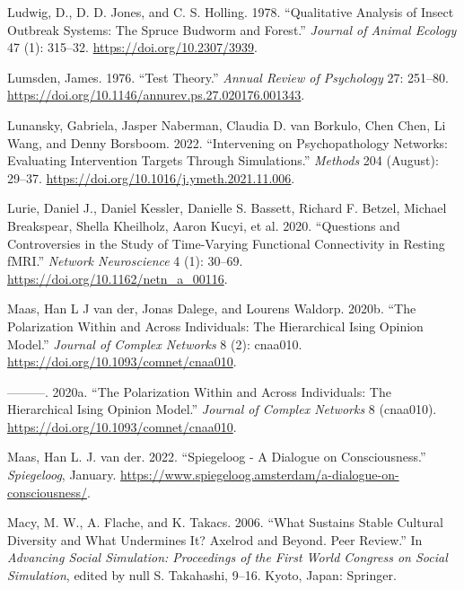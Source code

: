 \documentclass[
  a4paper,
  DIV=11,
  numbers=noendperiod]{scrreprt}
\newlength{\cslhangindent}
\newlength{\cslentryspacingunit} %
\newenvironment{CSLReferences}[2] %
 {%
  \setlength{\parindent}{0pt}
  \ifodd #1
  \let\oldpar\par
  \def\par{\hangindent=\cslhangindent\oldpar}
  \fi
  \setlength{\parskip}{#2\cslentryspacingunit}
 }%
 {}
\begin{document}
\begin{CSLReferences}{1}{0}
\leavevmode{}%
Ludwig, D., D. D. Jones, and C. S. Holling. 1978. {``Qualitative
Analysis of Insect Outbreak Systems: The Spruce Budworm and Forest.''}
\emph{Journal of Animal Ecology} 47 (1): 315--32.
\url{https://doi.org/10.2307/3939}.

\leavevmode{}%
Lumsden, James. 1976. {``Test Theory.''} \emph{Annual Review of
Psychology} 27: 251--80.
\url{https://doi.org/10.1146/annurev.ps.27.020176.001343}.

\leavevmode{}%
Lunansky, Gabriela, Jasper Naberman, Claudia D. van Borkulo, Chen Chen,
Li Wang, and Denny Borsboom. 2022. {``Intervening on Psychopathology
Networks: {Evaluating} Intervention Targets Through Simulations.''}
\emph{Methods} 204 (August): 29--37.
\url{https://doi.org/10.1016/j.ymeth.2021.11.006}.

\leavevmode{}%
Lurie, Daniel J., Daniel Kessler, Danielle S. Bassett, Richard F.
Betzel, Michael Breakspear, Shella Kheilholz, Aaron Kucyi, et al. 2020.
{``Questions and Controversies in the Study of Time-Varying Functional
Connectivity in Resting {fMRI}.''} \emph{Network Neuroscience} 4 (1):
30--69. \url{https://doi.org/10.1162/netn_a_00116}.

\leavevmode{}%
Maas, Han L J van der, Jonas Dalege, and Lourens Waldorp. 2020b. {``The
Polarization Within and Across Individuals: The Hierarchical Ising
Opinion Model.''} \emph{Journal of Complex Networks} 8 (2): cnaa010.
\url{https://doi.org/10.1093/comnet/cnaa010}.

\leavevmode{}%
---------. 2020a. {``The Polarization Within and Across Individuals: The
Hierarchical Ising Opinion Model.''} \emph{Journal of Complex Networks}
8 (cnaa010). \url{https://doi.org/10.1093/comnet/cnaa010}.

\leavevmode{}%
Maas, Han L. J. van der. 2022. {``Spiegeloog - A Dialogue on
Consciousness.''} \emph{Spiegeloog}, January.
\url{https://www.spiegeloog.amsterdam/a-dialogue-on-consciousness/}.

\leavevmode{}%
Macy, M. W., A. Flache, and K. Takacs. 2006. {``What {Sustains Stable
Cultural Diversity} and {What Undermines It}? {Axelrod} and Beyond.
{Peer} Review.''} In \emph{Advancing {Social Simulation}: {Proceedings}
of the {First World Congress} on {Social Simulation}}, edited by null S.
Takahashi, 9--16. {Kyoto, Japan}: {Springer}.


\end{CSLReferences}
\end{document}
